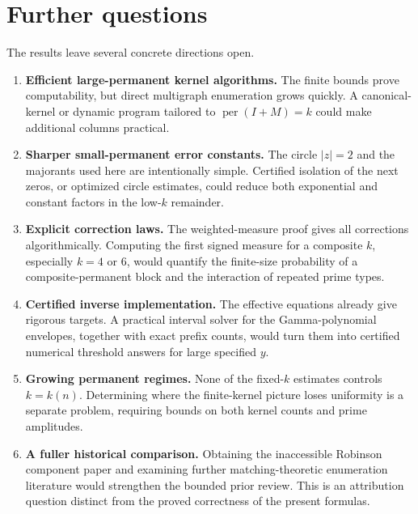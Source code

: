 \documentclass[11pt]{article}
\theoremstyle{definition}\newtheorem{definition}[theorem]{Definition}
\theoremstyle{remark}\newtheorem{remark}[theorem]{Remark}
\newcommand{\Per}{\operatorname{per}}
\begin{document}
\section{Further questions}\label{fpm:sec:questions}
The results leave several concrete directions open.
\begin{enumerate}
\item \textbf{Efficient large-permanent kernel algorithms.} The finite bounds prove computability, but direct multigraph enumeration grows quickly. A canonical-kernel or dynamic program tailored to $\Per(I+M)=k$ could make additional columns practical.
\item \textbf{Sharper small-permanent error constants.} The circle $|z|=2$ and the majorants used here are intentionally simple. Certified isolation of the next zeros, or optimized circle estimates, could reduce both exponential and constant factors in the low-$k$ remainder.
\item \textbf{Explicit correction laws.} The weighted-measure proof gives all corrections algorithmically. Computing the first signed measure for a composite $k$, especially $k=4$ or $6$, would quantify the finite-size probability of a composite-permanent block and the interaction of repeated prime types.
\item \textbf{Certified inverse implementation.} The effective equations already give rigorous targets. A practical interval solver for the Gamma-polynomial envelopes, together with exact prefix counts, would turn them into certified numerical threshold answers for large specified $y$.
\item \textbf{Growing permanent regimes.} None of the fixed-$k$ estimates controls $k=k(n)$. Determining where the finite-kernel picture loses uniformity is a separate problem, requiring bounds on both kernel counts and prime amplitudes.
\item \textbf{A fuller historical comparison.} Obtaining the inaccessible Robinson component paper and examining further matching-theoretic enumeration literature would strengthen the bounded prior review. This is an attribution question distinct from the proved correctness of the present formulas.
\end{enumerate}
\end{document}
